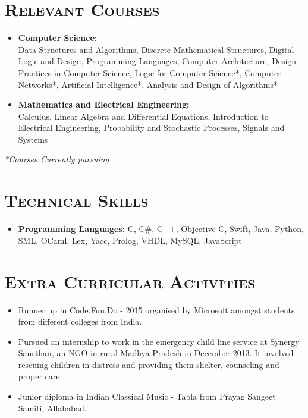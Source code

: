 \documentclass{article}
\makeatletter
\newenvironment{longversion}{}{} %
\newcommand{\headerrow}[2]
{\begin{tabular*}{\linewidth}{l@{\extracolsep{\fill}}r}
	#1 &
	#2 \\
\end{tabular*}}
\newcommand{\tmpsection}[1]{}
\let\tmpsection=\section
\renewcommand{\section}[1]{\tmpsection*{\textsc{#1}}}
\makeatother
\begin{document}
\begin{longversion}
\section{Relevant Courses}
\begin{itemize}
\setlength\itemsep{-1em}
\item \textbf{Computer Science:} \\
Data Structures and Algorithms, Discrete Mathematical Structures, Digital Logic and Design, Programming Languages, Computer Architecture, Design Practices in Computer Science, Logic for Computer Science*, Computer Networks*, Artificial Intelligence*, Analysis and Design of Algorithms*  \\

\item \textbf{Mathematics and Electrical Engineering:} \\
Calculus, Linear Algebra and Differential Equations, Introduction to Electrical Engineering,  Probability and Stochastic Processes, Signals and Systems
\end{itemize}
\textit{*Courses Currently pursuing}
\end{longversion}


\begin{longversion}
\section{Technical Skills}
\begin{itemize}
\item \textbf{Programming Languages:} C, C\#, C++, Objective-C, Swift, Java, Python, SML, OCaml, Lex, Yacc, Prolog, VHDL, MySQL, JavaScript 

\end{itemize}
\end{longversion}

\section{Extra Curricular Activities}

\begin{itemize}
    \setlength\itemsep{0em}
    \item Runner up in Code.Fun.Do - 2015 organised by Microsoft amongst students from different colleges from India.
    \item Pursued an internship to work in the emergency child line service at Synergy Sansthan, an NGO in rural Madhya Pradesh in December 2013. It involved rescuing children in distress and providing them shelter, counseling and proper care.
    \item Junior diploma in Indian Classical Music - Tabla from Prayag Sangeet Samiti, Allahabad. 
\end{itemize}

\end{document}
